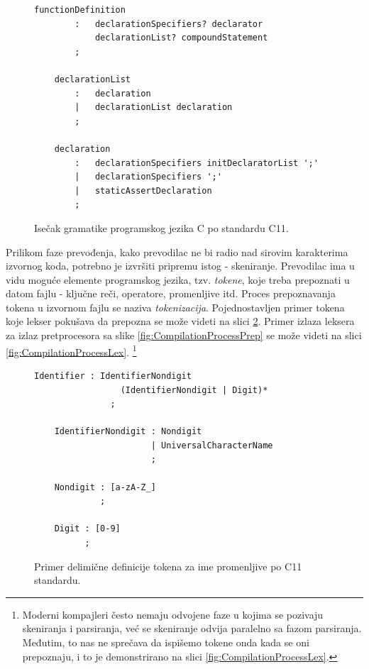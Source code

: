 \begin{figure}[h!]
    \begin{lstlisting}[language={}]
    functionDefinition
        :   declarationSpecifiers? declarator 
            declarationList? compoundStatement
        ;

    declarationList
        :   declaration
        |   declarationList declaration
        ;

    declaration
        :   declarationSpecifiers initDeclaratorList ';'
        | 	declarationSpecifiers ';'
        |   staticAssertDeclaration
        ;
    \end{lstlisting}
    \caption{Isečak gramatike programskog jezika C po standardu C11.}
    \label{fig:CompilationProcessGram}
\end{figure}

Prilikom faze prevođenja, kako prevodilac ne bi radio nad sirovim karakterima izvornog koda, potrebno je izvršiti pripremu istog - skeniranje. Prevodilac ima u vidu moguće elemente programskog jezika, tzv. \emph{tokene}, koje treba prepoznati u datom fajlu - ključne reči, operatore, promenljive itd. Proces prepoznavanja tokena u izvornom fajlu se naziva \emph{tokenizacija}. Pojednostavljen primer tokena koje lekser pokušava da prepozna se može videti na slici \ref{fig:CLexerExample}. Primer izlaza leksera za izlaz pretprocesora sa slike \ref{fig:CompilationProcessPrep} se može videti na slici \ref{fig:CompilationProcessLex}.
\footnote{Moderni kompajleri često nemaju odvojene faze u kojima se pozivaju skeniranja i parsiranja, već se skeniranje odvija paralelno sa fazom parsiranja. Međutim, to nas ne sprečava da ispišemo tokene onda kada se oni prepoznaju, i to je demonstrirano na slici \ref{fig:CompilationProcessLex}.}

\begin{figure}[h!]
    \begin{lstlisting}[language={}]
    Identifier : IdentifierNondigit 
                 (IdentifierNondigit | Digit)*
               ;

    IdentifierNondigit : Nondigit
                       | UniversalCharacterName
                       ;

    Nondigit : [a-zA-Z_]
             ;

    Digit : [0-9]
          ;
    \end{lstlisting}
    \caption{Primer delimične definicije tokena za ime promenljive po C11 standardu.}
    \label{fig:CLexerExample}
\end{figure}

